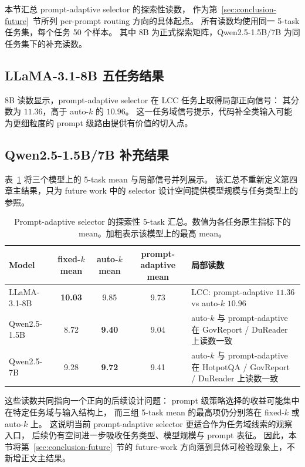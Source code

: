 本节汇总 prompt-adaptive selector 的探索性读数，
作为第~\ref{sec:conclusion-future}~节所列 per-prompt routing 方向的具体起点。
所有读数均使用同一 5-task 任务集，每个任务 50 个样本。
其中 8B 为正式探索矩阵，Qwen2.5-1.5B/7B 为同任务集下的补充读数。

\subsection{LLaMA-3.1-8B 五任务结果}
\label{sec:app-prompt-adaptive-8b}

8B 读数显示，prompt-adaptive selector 在 LCC 任务上取得局部正向信号：
其分数为 $11.36$，高于 auto-$k$ 的 $10.96$。
这一任务域信号提示，代码补全类输入可能为更细粒度的 prompt 级路由提供有价值的切入点。

\subsection{Qwen2.5-1.5B/7B 补充结果}
\label{sec:app-prompt-adaptive-offprotocol}

表~\ref{tab:app-prompt-adaptive-summary} 将三个模型上的 5-task mean 与局部信号并列展示。
该汇总不重新定义第四章主结果，只为 future work 中的 selector 设计空间提供模型规模与任务类型上的参照。

\begin{table}[!htbp]
  \centering
  \small
  \setlength{\tabcolsep}{5pt}
  \begin{tabularx}{\linewidth}{lcccX}
    \toprule
    \textbf{Model} & \textbf{fixed-$k$ mean} & \textbf{auto-$k$ mean} & \textbf{prompt-adaptive mean} & \textbf{局部读数} \\
    \midrule
    LLaMA-3.1-8B & \textbf{10.03} & 9.85 & 9.73 & LCC: prompt-adaptive $11.36$ vs auto-$k$ $10.96$ \\
    Qwen2.5-1.5B & 8.72 & \textbf{9.40} & 9.04 & auto-$k$ 与 prompt-adaptive 在 GovReport / DuReader 上读数一致 \\
    Qwen2.5-7B & 9.28 & \textbf{9.72} & 9.41 & auto-$k$ 与 prompt-adaptive 在 HotpotQA / GovReport / DuReader 上读数一致 \\
    \bottomrule
  \end{tabularx}
  \caption{Prompt-adaptive selector 的探索性 5-task 汇总。数值为各任务原生指标下的 mean。加粗表示该模型上的最高 mean。}
  \label{tab:app-prompt-adaptive-summary}
\end{table}

这些读数共同指向一个正向的后续设计问题：
prompt 级策略选择的收益可能集中在特定任务域与输入结构上，
而三组 5-task mean 的最高项仍分别落在 fixed-$k$ 或 auto-$k$ 上。
这说明当前 prompt-adaptive selector 更适合作为任务域线索的观察入口，
后续仍有空间进一步吸收任务类型、模型规模与 prompt 表征。
因此，本节将第~\ref{sec:conclusion-future}~节的 future-work 方向落到具体可检验现象上，不新增正文主结果。
